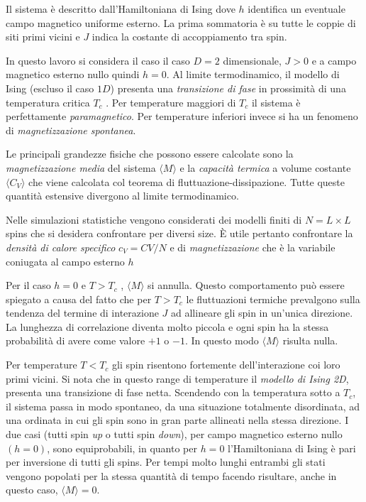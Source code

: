 \documentclass[a4paper,12pt]{article}
\begin{document}
Il sistema è descritto dall’Hamiltoniana di Ising
dove $h$ identifica un eventuale campo magnetico uniforme esterno. La prima sommatoria è  su tutte le coppie di siti primi vicini e $J$ indica la costante di accoppiamento tra spin. 

In questo lavoro si considera il caso il caso $D = 2$ dimensionale, $J > 0$ e a campo magnetico esterno nullo quindi $h = 0$. Al limite termodinamico, il modello di Ising (escluso il caso $1D$) presenta una \emph{transizione di fase} in prossimità di una temperatura critica $T_c$ . Per temperature maggiori di $T_c$ il sistema \`e perfettamente \emph{paramagnetico}. Per temperature inferiori invece si ha un fenomeno di \emph{magnetizzazione spontanea}. 

Le principali grandezze fisiche che possono essere calcolate sono la \emph{magnetizzazione media} del sistema $\langle M\rangle$  e la \emph{capacità termica} a volume costante $\langle C_V \rangle$ che viene calcolata col teorema di fluttuazione-dissipazione. Tutte queste quantit\`a estensive divergono al limite termodinamico. 

Nelle simulazioni statistiche vengono considerati dei modelli finiti di $N = L \times L$ spins che si desidera confrontare per diversi size. \`E utile pertanto confrontare la \emph{densità di calore specifico} $c_V = CV /N$ e di \emph{magnetizzazione} che è la variabile coniugata al campo esterno $h$

Per il caso $h = 0$ e $T > T_c$ , $\langle M \rangle$ si annulla. Questo comportamento può essere spiegato a causa del fatto che per $T > T_c$ le fluttuazioni termiche prevalgono sulla tendenza del termine di interazione $J$ ad allineare gli spin in un'unica direzione. La lunghezza di correlazione diventa molto piccola e ogni spin ha la stessa probabilità di avere come valore $+1$ o $-1$. In questo modo $\langle M \rangle$ risulta nulla. 

Per temperature $T < T_c$ gli spin risentono fortemente dell’interazione coi loro primi vicini. Si nota che in questo range di temperature il \emph{modello di Ising 2D}, presenta una transizione di fase netta. Scendendo con la temperatura sotto a $T_c$, il sistema passa in modo spontaneo, da una situazione totalmente disordinata, ad una ordinata in cui gli spin sono in gran parte allineati nella stessa direzione. I due casi (tutti spin \emph{up} o tutti spin \emph{down}), per campo magnetico esterno nullo $(h = 0)$, sono equiprobabili, in quanto per $h = 0$ l’Hamiltoniana di Ising è pari per inversione di tutti gli spins. Per tempi molto lunghi entrambi gli stati vengono popolati per la stessa quantità di tempo facendo risultare, anche in questo caso, $\langle M \rangle = 0$. 
\end{document}

